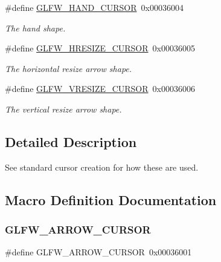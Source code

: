 \begin{DoxyCompactItemize}
\#define \hyperlink{group__shapes_ga1db35e20849e0837c82e3dc1fd797263}{G\+L\+F\+W\+\_\+\+H\+A\+N\+D\+\_\+\+C\+U\+R\+S\+OR}~0x00036004
\begin{DoxyCompactList}\small\item\em The hand shape. \end{DoxyCompactList}\item 
\#define \hyperlink{group__shapes_gabb3eb0109f11bb808fc34659177ca962}{G\+L\+F\+W\+\_\+\+H\+R\+E\+S\+I\+Z\+E\+\_\+\+C\+U\+R\+S\+OR}~0x00036005
\begin{DoxyCompactList}\small\item\em The horizontal resize arrow shape. \end{DoxyCompactList}\item 
\#define \hyperlink{group__shapes_gaf024f0e1ff8366fb2b5c260509a1fce5}{G\+L\+F\+W\+\_\+\+V\+R\+E\+S\+I\+Z\+E\+\_\+\+C\+U\+R\+S\+OR}~0x00036006
\begin{DoxyCompactList}\small\item\em The vertical resize arrow shape. \end{DoxyCompactList}\end{DoxyCompactItemize}


\subsection{Detailed Description}
See standard cursor creation for how these are used. 

\subsection{Macro Definition Documentation}
\mbox{\label{group__shapes_ga8ab0e717245b85506cb0eaefdea39d0a}} 
\subsubsection{\texorpdfstring{G\+L\+F\+W\+\_\+\+A\+R\+R\+O\+W\+\_\+\+C\+U\+R\+S\+OR}{GLFW\_ARROW\_CURSOR}\hspace{0.1cm}{\footnotesize\ttfamily [1/5]}}
{\footnotesize\ttfamily \#define G\+L\+F\+W\+\_\+\+A\+R\+R\+O\+W\+\_\+\+C\+U\+R\+S\+OR~0x00036001}



